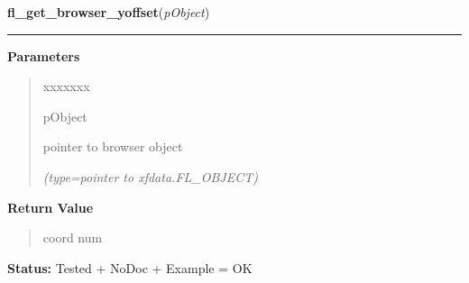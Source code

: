     \label{xformslib:library:fl_get_browser_yoffset}

    \vspace{0.5ex}

\hspace{.8\funcindent}\begin{boxedminipage}{\funcwidth}

    \raggedright \textbf{fl\_get\_browser\_yoffset}(\textit{pObject})

    \vspace{-1.5ex}

    \rule{\textwidth}{0.5\fboxrule}
\setlength{\parskip}{2ex}
\setlength{\parskip}{1ex}
      \textbf{Parameters}
      \vspace{-1ex}

      \begin{quote}
        \begin{Ventry}{xxxxxxx}

          \item[pObject]

          pointer to browser object

            {\it (type=pointer to xfdata.FL\_OBJECT)}

        \end{Ventry}

      \end{quote}

      \textbf{Return Value}
    \vspace{-1ex}

      \begin{quote}
      coord num

      \end{quote}

\textbf{Status:} Tested + NoDoc + Example = OK



    \end{boxedminipage}

    \label{xformslib:library:fl_get_browser_rel_yoffset}

    \vspace{0.5ex}


